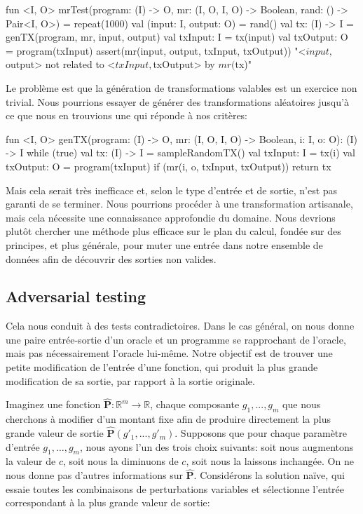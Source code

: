 \begin{kotlinlisting}
fun <I, O> mrTest(program: (I) -> O, mr: (I, O, I, O) -> Boolean, rand: () -> Pair<I, O>) =
    repeat(1000) {
        val (input: I, output: O) = rand()
        val tx: (I) -> I = genTX(program, mr, input, output)
        val txInput: I = tx(input)
        val txOutput: O = program(txInput)
        assert(mr(input, output, txInput, txOutput)) {
            "<$input, $output> not related to <$txInput, $txOutput> by $mr ($tx)"
        }
    }
\end{kotlinlisting}
%
Le problème est que la génération de transformations valables est un exercice non trivial. Nous pourrions essayer de générer des transformations aléatoires jusqu'à ce que nous en trouvions une qui réponde à nos critères:
%
\begin{kotlinlisting}
fun <I, O> genTX(program: (I) -> O, mr: (I, O, I, O) -> Boolean, i: I, o: O): (I) -> I {
    while (true) {
        val tx: (I) -> I = sampleRandomTX()
        val txInput: I = tx(i)
        val txOutput: O = program(txInput)
        if (mr(i, o, txInput, txOutput)) return tx
    }
}
\end{kotlinlisting}

Mais cela serait très inefficace et, selon le type d'entrée et de sortie, n'est pas garanti de se terminer. Nous pourrions procéder à une transformation artisanale, mais cela nécessite une connaissance approfondie du domaine. Nous devrions plutôt chercher une méthode plus efficace sur le plan du calcul, fondée sur des principes, et plus générale, pour muter une entrée dans notre ensemble de données afin de découvrir des sorties non valides.

\subsection{Adversarial testing}

Cela nous conduit à des tests contradictoires. Dans le cas général, on nous donne une paire entrée-sortie d'un oracle et un programme se rapprochant de l'oracle, mais pas nécessairement l'oracle lui-même. Notre objectif est de trouver une petite modification de l'entrée d'une fonction, qui produit la plus grande modification de sa sortie, par rapport à la sortie originale.

Imaginez une fonction $\mathbf{\hat P}: \mathbb R^m \rightarrow \mathbb R$, chaque composante $g_1, ..., g_{m}$ que nous cherchons à modifier d'un montant fixe afin de produire directement la plus grande valeur de sortie $\mathbf{\hat P}(g'_1, ..., g'_{m})$. Supposons que pour chaque paramètre d'entrée $g_1, \ldots, g_{m}$, nous ayons l'un des trois choix suivants: soit nous augmentons la valeur de $c$, soit nous la diminuons de $c$, soit nous la laissons inchangée. On ne nous donne pas d'autres informations sur $\mathbf{\hat P}$. Considérons la solution na\"ive, qui essaie toutes les combinaisons de perturbations variables et sélectionne l'entrée correspondant à la plus grande valeur de sortie:


